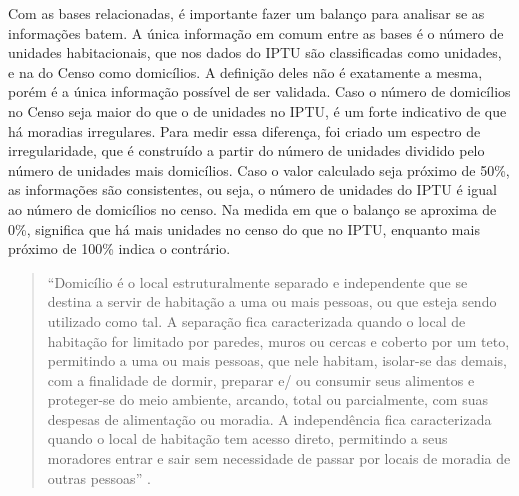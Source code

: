 Com as bases relacionadas, é importante fazer um balanço para analisar se as informações batem. A única informação em comum entre as bases é o número de unidades habitacionais, que nos dados do IPTU são classificadas como unidades, e na do Censo como domicílios. A definição deles não é exatamente a mesma, porém é a única informação possível de ser validada. Caso o número de domicílios no Censo seja maior do que o de unidades no IPTU, é um forte indicativo de que há moradias irregulares. Para medir essa diferença, foi criado um espectro de irregularidade, que é construído a partir do número de unidades dividido pelo número de unidades mais domicílios. Caso o valor calculado seja próximo de 50\%, as informações são consistentes, ou seja, o número de unidades do IPTU é igual ao número de domicílios no censo. Na medida em que o balanço se aproxima de 0\%, significa que há mais unidades no censo do que no IPTU, enquanto mais próximo de 100\% indica o contrário.

\begin{quote}
    ``Domicílio é o local estruturalmente separado e independente que se destina a servir de habitação a uma ou mais pessoas, ou que esteja sendo utilizado como tal. A separação fica caracterizada quando o local de habitação for limitado por paredes, muros ou cercas e coberto por um teto, permitindo a uma ou mais pessoas, que nele habitam, isolar-se das demais, com a finalidade de dormir, preparar e/ ou consumir seus alimentos e proteger-se do meio ambiente, arcando, total ou parcialmente, com suas despesas de alimentação ou moradia. A independência fica caracterizada quando o local de habitação tem acesso direto, permitindo a seus moradores entrar e sair sem necessidade de passar por locais de moradia de outras pessoas'' \cite{IBGE2013}.
\end{quote}

